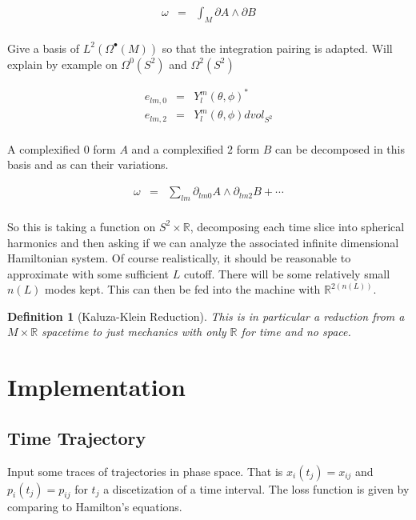 \documentclass[a4paper,landscape]{article}
\theoremstyle{change}
\newtheorem{definition}[equation]{Definition}
\theoremstyle{nonumberplain}
\numberwithin{equation}{section}
\begin{document}
\begin{eqnarray*}
\omega &=& \int_M \partial A \wedge \partial B\\
\end{eqnarray*}

Give a basis of $L^2 ( \Omega^\bullet (M))$ so that the integration pairing is adapted. Will explain by example on $\Omega^0 (S^2)$ and $\Omega^2 (S^2)$

\begin{eqnarray*}
e_{lm,0} &=& Y_l^m (\theta , \phi)^*\\
e_{lm,2} &=& Y_l^m (\theta , \phi) dvol_{S^2}\\
\end{eqnarray*}

A complexified $0$ form $A$ and a complexified $2$ form $B$ can be decomposed in this basis and as can their variations.

\begin{eqnarray*}
\omega &=& \sum_{lm} \partial_{lm0} A \wedge \partial_{lm2} B + \cdots\\
\end{eqnarray*}

So this is taking a function on $S^2 \times \mathbb{R}$, decomposing each time slice into spherical harmonics and then asking if we can analyze the associated infinite dimensional Hamiltonian system. Of course realistically, it should be reasonable to approximate with some sufficient $L$ cutoff. There will be some relatively small $n(L)$ modes kept. This can then be fed into the machine with $\mathbb{R}^{2(n(L))}$.

\begin{definition}[Kaluza-Klein Reduction]
This is in particular a reduction from a $M \times \mathbb{R}$ spacetime to just mechanics with only $\mathbb{R}$ for time and no space.
\end{definition}

\section{Implementation}

\subsection{Time Trajectory}

Input some traces of trajectories in phase space. That is $x_i (t_j) = x_{ij}$ and $p_i (t_j)=p_{ij}$ for $t_j$ a discetization of a time interval. The loss function is given by comparing to Hamilton's equations.
\end{document}
